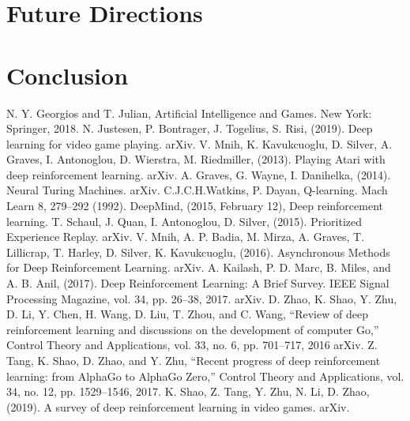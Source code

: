 \documentclass[conference]{IEEEtran}
\begin{document}
\section{Future Directions}


\section*{Conclusion}



\begin{thebibliography}{00}
      N. Y. Georgios and T. Julian, Artificial Intelligence and Games. New York: Springer, 2018.
      N. Justesen, P. Bontrager, J. Togelius, S. Risi, (2019). Deep learning for video game playing. arXiv.
      V. Mnih, K. Kavukcuoglu, D. Silver, A. Graves, I. Antonoglou, D. Wierstra, M. Riedmiller, (2013). Playing Atari with deep reinforcement learning. arXiv.
      A. Graves, G. Wayne, I. Danihelka, (2014). Neural Turing Machines. arXiv.
      C.J.C.H.Watkins, P. Dayan, Q-learning. Mach Learn 8, 279–292 (1992).
      DeepMind, (2015, February 12), Deep reinforcement learning.
      T. Schaul, J. Quan, I. Antonoglou, D. Silver, (2015). Prioritized Experience Replay. arXiv.
      V. Mnih, A. P. Badia, M. Mirza, A. Graves, T. Lillicrap, T. Harley, D. Silver, K. Kavukcuoglu, (2016). Asynchronous Methods for Deep Reinforcement Learning. arXiv.
      A. Kailash, P. D. Marc, B. Miles, and A. B. Anil, (2017). Deep Reinforcement Learning: A Brief Survey. IEEE Signal Processing Magazine, vol. 34, pp. 26–38, 2017. arXiv.
     D. Zhao,  K. Shao, Y. Zhu, D. Li, Y. Chen, H. Wang, D. Liu, T. Zhou, and C. Wang, “Review of deep reinforcement learning and discussions on the development of computer Go,” Control Theory and Applications, vol. 33, no. 6, pp. 701–717, 2016 arXiv.
     Z. Tang, K. Shao, D. Zhao, and Y. Zhu, “Recent progress of deep reinforcement learning: from AlphaGo to AlphaGo Zero,” Control Theory and Applications, vol. 34, no. 12, pp. 1529–1546, 2017.
     K. Shao, Z. Tang, Y. Zhu, N. Li, D. Zhao, (2019). A survey of deep reinforcement learning in video games. arXiv.
    

\end{thebibliography}
\end{document}
